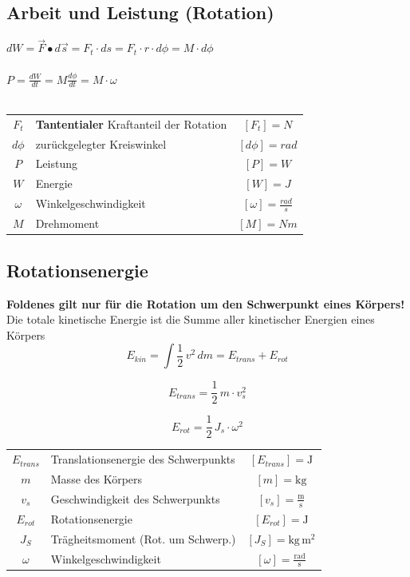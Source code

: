 	
	\vfill\null
	\columnbreak
	
	
	
	\subsection{Arbeit und Leistung (Rotation)}
	$dW = \vec{F} \bullet d\vec{s} = F_t \cdot ds = F_t \cdot r \cdot d \phi = M \cdot d \phi $ \\
	\\
	$P = \frac{dW}{dt} = M \frac{d \phi}{dt} = M \cdot \omega$ \\
	\\
	\begin{tabular}{c l c}
	$F_t$ & \textbf{Tantentialer} Kraftanteil der Rotation & $[F_t] = N$ \\
	$d \phi$ & zurückgelegter Kreiswinkel & $[d \phi] = rad$ \\	
	$P$ & Leistung  & $[P] = W$ \\
	$W$ & Energie  & $[W] = J$ \\
	$\omega$ & Winkelgeschwindigkeit & $[\omega] = \frac{rad}{s}$ \\
	$M$ & Drehmoment & $[M] = Nm$ \\
	\end{tabular}
	
	
	
	\subsection{Rotationsenergie}
	\textbf{Foldenes gilt nur für die Rotation um den Schwerpunkt eines Körpers!} \\
	
	Die totale kinetische Energie ist die Summe aller kinetischer Energien eines Körpers \\
	
	$$ \boxed{ E_{kin} = \int \frac{1}{2} \, v^2 \, dm  = E_{trans} + E_{rot} } $$ 
	
	\begin{minipage}{0.48\linewidth}
	$$ \boxed{ E_{trans} = \frac{1}{2} \, m \cdot v_s^2 } $$ 
	\end{minipage}
	\hfill
	\begin{minipage}{0.48\linewidth}
	$$ \boxed{ E_{rot} = \frac{1}{2} \, J_s \cdot \omega^2 } $$ 
	\end{minipage}
	

	\begin{tabular}{c l c}
	$E_{trans}$ & Translationsenergie des Schwerpunkts & $[E_{trans}] = \mathrm{J}$ \\
	$m$ & Masse des Körpers & $[m] = \mathrm{kg}$ \\
	$v_s$ & Geschwindigkeit des Schwerpunkts & $[v_s] = \mathrm{\frac{m}{s}}$ \\
	$E_{rot}$ & Rotationsenergie & $[E_{rot}] = \mathrm{J}$ \\
	$J_S$ & Trägheitsmoment (Rot. um Schwerp.)  & $[J_S] = \mathrm{kg \, m^2}$ \\
	$\omega$ & Winkelgeschwindigkeit & $[\omega] = \mathrm{\frac{rad}{s}}$ \\
	\end{tabular}
	 
